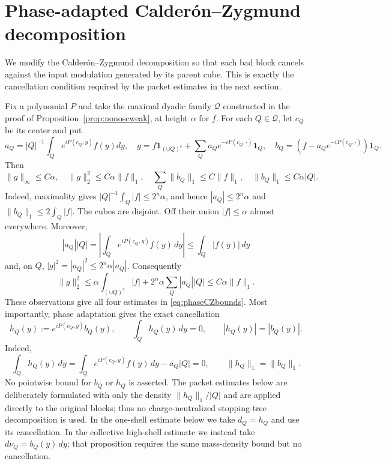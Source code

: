 \documentclass[11pt]{article}
\numberwithin{equation}{section}
\theoremstyle{remark}
\theoremstyle{definition}
\newcommand{\cQ}{\mathcal Q}
\newcommand{\norm}[1]{\lVert #1\rVert}
\begin{document}
\section{Phase-adapted Calder\'on--Zygmund decomposition}
\label{sec:phase-cz}

We modify the Calder\'on--Zygmund decomposition so that each bad block
cancels against the input modulation generated by its parent cube.  This
is exactly the cancellation condition required by the packet estimates in
the next section.

Fix a polynomial $P$ and take the maximal dyadic family $\cQ$ constructed
in the proof of Proposition~\ref{prop:nonoscweak}, at height $\alpha$ for
$f$.  For each $Q\in\cQ$, let $c_Q$ be its center and
put
\begin{equation}\label{eq:phaseCZ}
 a_Q=|Q|^{-1}\int_Qe^{iP(c_Q,y)}f(y)dy,
 \quad
 g=f\mathbf1_{(\cup Q)^c}+\sum_Qa_Qe^{-iP(c_Q,\cdot)}\mathbf1_Q,
 \quad b_Q=(f-a_Qe^{-iP(c_Q,\cdot)})\mathbf1_Q.
\end{equation}
Then
\begin{equation}\label{eq:phaseCZbounds}
 \norm g_\infty\le C\alpha,
 \quad \norm g_2^2\le C\alpha\norm f_1,
 \quad \sum_Q\norm{b_Q}_1\le C\norm f_1,
 \quad \norm{b_Q}_1\le C\alpha |Q|.
\end{equation}
Indeed, maximality gives
$|Q|^{-1}\int_Q|f|\le 2^n\alpha$, and hence
$|a_Q|\le2^n\alpha$ and
$\norm{b_Q}_1\le2\int_Q|f|$.  The cubes are disjoint.  Off their union
$|f|\le\alpha$ almost everywhere.  Moreover,
\[
 |a_Q||Q|
 =\left|\int_Qe^{iP(c_Q,y)}f(y)\,dy\right|
 \le\int_Q|f(y)|\,dy
\]
and, on $Q$,
$|g|^2=|a_Q|^2\le2^n\alpha|a_Q|$.  Consequently
\[
 \norm g_2^2
 \le \alpha\int_{(\cup Q)^c}|f|
      +2^n\alpha\sum_Q |a_Q||Q|
 \le C\alpha\norm f_1.
\]
These observations give all four estimates in \eqref{eq:phaseCZbounds}.
Most importantly, phase adaptation gives the exact cancellation
\begin{equation}\label{eq:adaptcancel}
 h_Q(y):=e^{iP(c_Q,y)}b_Q(y),
 \qquad \int_Qh_Q(y)\,dy=0,
 \qquad |h_Q(y)|=|b_Q(y)|.
\end{equation}
Indeed,
\[
 \int_Qh_Q(y)\,dy
 =\int_Qe^{iP(c_Q,y)}f(y)\,dy-a_Q|Q|=0,
 \qquad \|h_Q\|_1=\|b_Q\|_1.
\]
No pointwise bound for $b_Q$ or $h_Q$ is asserted.  The packet estimates
below are deliberately formulated with only the density
$\norm{h_Q}_1/|Q|$ and are applied directly to the original blocks; thus
no charge-neutralized stopping-tree decomposition is used.  In the
one-shell estimate below we take $d_Q=h_Q$ and use its cancellation.  In
the collective high-shell estimate we instead take
$d\nu_Q=b_Q(y)\,dy$; that proposition requires the same mass-density
bound but no cancellation.
\end{document}
